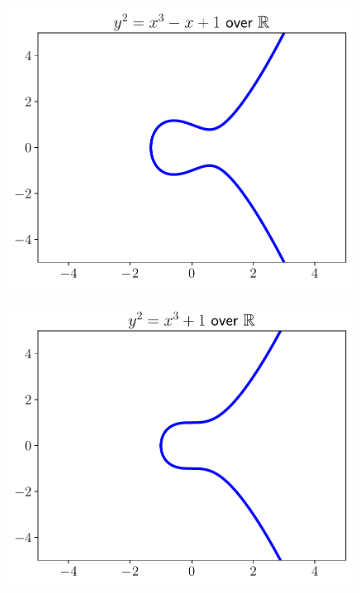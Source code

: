 \begin{figure}[p]
    \begin{subfigure}[t]{0.45\textwidth}
    \includegraphics[width=\textwidth]{plots/ec_reals/ec_reals_n1_1.pdf}
    \end{subfigure}
    \begin{subfigure}[t]{0.45\textwidth}
    \includegraphics[width=\textwidth]{plots/ec_reals/ec_reals_0_1.pdf}
    \end{subfigure}


\end{figure}
